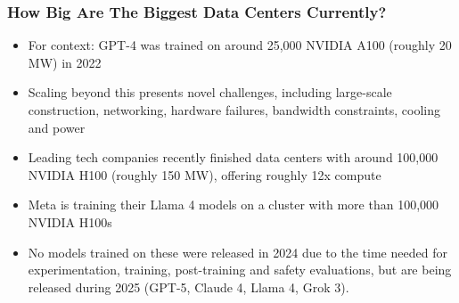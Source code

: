 \documentclass[aspectratio=169]{beamer}
\begin{document}
    \begin{frame}
        \frametitle{How Big Are The Biggest Data Centers Currently?}
        \begin{itemize}
            \item For context: GPT-4 was trained on around 25,000 NVIDIA A100 (roughly 20 MW) in 2022~\parencite{epoch_notable_ai_models_2025}
            \item Scaling beyond this presents novel challenges, including large-scale construction, networking, hardware failures, bandwidth constraints, cooling and power
            \item Leading tech companies recently finished data centers with around 100,000 NVIDIA H100 (roughly 150 MW), offering roughly 12x compute~\parencite{patel_transcript_2025}
            \item Meta is training their Llama 4 models on a cluster with more than 100,000 NVIDIA H100s~\parencite{wired_metas_2024}
            \item No models trained on these were released in 2024 due to the time needed for experimentation, training, post-training and safety evaluations, but are being released during 2025 (GPT-5, Claude 4, Llama 4, Grok 3).
        \end{itemize}
    \end{frame}
\end{document}
